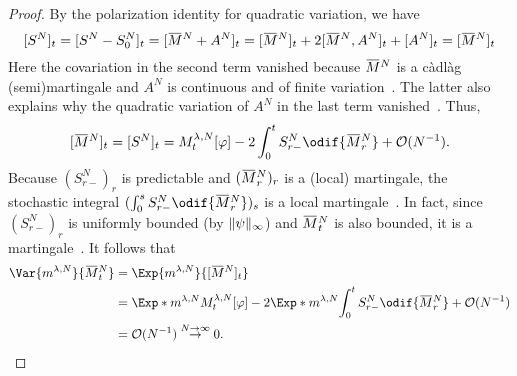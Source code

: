 \begin{proof}
  By the polarization identity for quadratic variation, we have
  \begin{equation}
    \sbr{S^N}_t
    = \sbr{S^N - S_0^N}_t
    = \sbr{\ol{M}^N + A^N}_t
    = \sbr{\ol{M}^N}_t + 2 \sbr{ \ol{M}^N, A^N }_t + \sbr{ A^N }_t
    = \sbr{\ol{M}^N}_t
  \end{equation}
  Here the covariation in the second term vanished because \( \ol{M}^N \) is a càdlàg (semi)martingale and \( A^N \) is continuous and of finite variation~\cite[Cor. 8.5]{klebanerIntroductionStochasticCalculus2012}. %
  The latter also explains why the quadratic variation of \( A^N \) in the last term vanished~\cite[Th. 1.10]{klebanerIntroductionStochasticCalculus2012}.
  Thus,
  \begin{equation}
    \sbr{\ol{M}^N}_t = \sbr{S^N}_t = M_t^{\lambda, N}[\varphi] - 2 \int_0^t S_{r-}^N \odif{\ol{M}_r^N} + \mathcal{O}(N^{-1}).
  \end{equation}
  Because \( ( S_{r-}^N )_r \) is predictable and \( ( \ol{M}_r^N )_r \) is a (local) martingale, the stochastic integral \( ( \int_0^s S_{r-}^N \odif{\ol{M}_r^N} )_s \) is a local martingale~\cite[218]{klebanerIntroductionStochasticCalculus2012}.
  In fact, since \( (S_{r-}^N)_r \) is uniformly bounded (by \( \lVert\psi\rVert_\infty \)) and \( \ol{M}_t^N \) is also bounded, %
  it is a martingale~\cite[Cor. 7.22]{klebanerIntroductionStochasticCalculus2012}.
  It follows that
  \begin{equation}
    \begin{split}
      \Var{\lawmu^{\lambda,N}}{\ol{M}_t^N}
       & = \Exp{\lawmu^{\lambda,N}}{\sbr{\ol{M}^N}_t}                                                                                                           \\
       & = \Exp*{\lawmu^{\lambda,N}}{M_t^{\lambda, N}\sbr*{ \varphi }} - 2 \Exp*{\lawmu^{\lambda,N}}{\int_0^t S_{r-}^N \odif{\ol{M}_r^N}} + \mathcal{O}(N^{-1}) \\
       & = \mathcal{O}(N^{-1}) \overset{N\to\infty}{\to} 0. \qedhere
    \end{split}
  \end{equation}
\end{proof}
